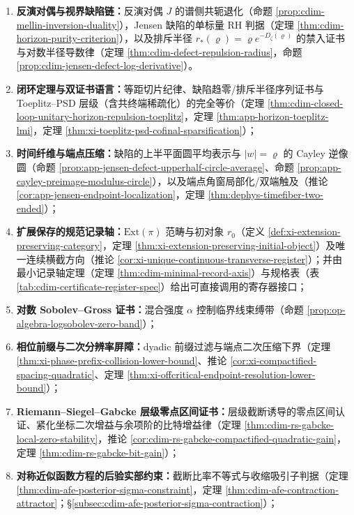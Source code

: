 \begin{enumerate}
  \item \textbf{反演对偶与视界缺陷链：}反演对偶 \(J\) 的谱侧共轭退化（命题 \ref{prop:cdim-mellin-inversion-duality}），Jensen 缺陷的单标量 RH 判据（定理 \ref{thm:cdim-horizon-purity-criterion}），以及排斥半径 \(r_\ast(\varrho)=\varrho e^{-D_{\zeta}(\varrho)}\) 的禁入证书与对数半径导数律（定理 \ref{thm:cdim-defect-repulsion-radius}，命题 \ref{prop:cdim-jensen-defect-log-derivative}）。
  \item \textbf{闭环定理与双证书语言：}等距切片纪律、缺陷趋零/排斥半径序列证书与 Toeplitz--PSD 层级（含共终端稀疏化）的完全等价（定理 \ref{thm:cdim-closed-loop-unitary-horizon-repulsion-toeplitz}，定理 \ref{thm:app-horizon-toeplitz-lmi}，定理 \ref{thm:xi-toeplitz-psd-cofinal-sparsification}）；
  \item \textbf{时间纤维与端点压缩：}缺陷的上半平面圆平均表示与 \texorpdfstring{$|w|=\varrho$}{|w|=varrho} 的 Cayley 逆像圆（命题 \ref{prop:app-jensen-defect-upperhalf-circle-average}、命题 \ref{prop:app-cayley-preimage-modulus-circle}），以及端点角窗局部化/双端触及（推论 \ref{cor:app-jensen-endpoint-localization}，定理 \ref{thm:dephys-timefiber-two-ended}）；
  \item \textbf{扩展保存的规范记录轴：}\(\mathrm{Ext}(\pi)\) 范畴与初对象 \(r_0\)（定义 \ref{def:xi-extension-preserving-category}，定理 \ref{thm:xi-extension-preserving-initial-object}）及唯一连续横截方向（推论 \ref{cor:xi-unique-continuous-transverse-register}）；并由最小记录轴定理（定理 \ref{thm:cdim-minimal-record-axis}）与规格表（表 \ref{tab:cdim-certificate-register-spec}）给出可直接调用的寄存器接口；
  \item \textbf{对数 Sobolev--Gross 证书：}混合强度 \(\alpha\) 控制临界线束缚带（命题 \ref{prop:op-algebra-logsobolev-zero-band}）；
  \item \textbf{相位前缀与二次分辨率屏障：}dyadic 前缀过滤与端点二次压缩下界（定理 \ref{thm:xi-phase-prefix-collision-lower-bound}、推论 \ref{cor:xi-compactified-spacing-quadratic}、定理 \ref{thm:xi-offcritical-endpoint-resolution-lower-bound}）；
  \item \textbf{Riemann--Siegel--Gabcke 层级零点区间证书：}层级截断诱导的零点区间认证、紧化坐标二次增益与余项阶的比特增益律（定理 \ref{thm:cdim-rs-gabcke-local-zero-stability}，推论 \ref{cor:cdim-rs-gabcke-compactified-quadratic-gain}，定理 \ref{thm:cdim-rs-gabcke-bit-gain}）；
  \item \textbf{对称近似函数方程的后验实部约束：}截断比率不等式与收缩吸引子判据（定理 \ref{thm:cdim-afe-posterior-sigma-constraint}，定理 \ref{thm:cdim-afe-contraction-attractor}；\S\ref{subsec:cdim-afe-posterior-sigma-contraction}）；

\end{enumerate}

